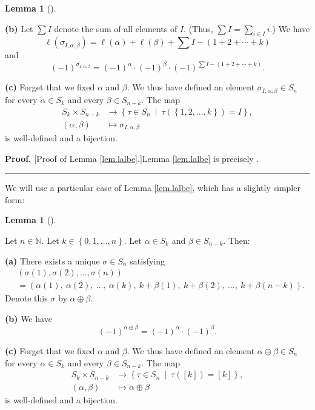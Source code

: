 \documentclass
[numbers=enddot,12pt,final,onecolumn,notitlepage,english]{scrartcl}%
\theoremstyle{definition}
\newtheorem{lem}[theo]{Lemma}
\newenvironment{lemma}[1][]
{\begin{lem}[#1]\begin{leftbar}}
{\end{leftbar}\end{lem}}
\newenvironment{proof}[1][Proof]{\noindent\textbf{#1.} }{\ \rule{0.5em}{0.5em}}
\let\sumnonlimits\sum
\renewcommand{\sum}{\sumnonlimits\limits}
\newenvironment{verlong}{}{}
\begin{document}
\begin{verlong}
\begin{lemma}
\textbf{(b)} Let $\sum I$ denote the sum of all elements of $I$. (Thus, $\sum
I=\sum_{i\in I}i$.) We have%
\[
\ell\left(  \sigma_{I,\alpha,\beta}\right)  =\ell\left(  \alpha\right)
+\ell\left(  \beta\right)  +\sum I-\left(  1+2+\cdots+k\right)
\]
and%
\[
\left(  -1\right)  ^{\sigma_{I,\alpha,\beta}}=\left(  -1\right)  ^{\alpha
}\cdot\left(  -1\right)  ^{\beta}\cdot\left(  -1\right)  ^{\sum I-\left(
1+2+\cdots+k\right)  }.
\]


\textbf{(c)} Forget that we fixed $\alpha$ and $\beta$. We thus have defined
an element $\sigma_{I,\alpha,\beta}\in S_{n}$ for every $\alpha\in S_{k}$ and
every $\beta\in S_{n-k}$. The map%
\begin{align*}
S_{k}\times S_{n-k}  &  \rightarrow\left\{  \tau\in S_{n}\ \mid\ \tau\left(
\left\{  1,2,\ldots,k\right\}  \right)  =I\right\}  ,\\
\left(  \alpha,\beta\right)   &  \mapsto\sigma_{I,\alpha,\beta}%
\end{align*}
is well-defined and a bijection.
\end{lemma}

\begin{proof}
[Proof of Lemma \ref{lem.lalbe}.]Lemma \ref{lem.lalbe} is precisely
\cite[Exercise 5.14]{detnotes}.
\end{proof}

We will use a particular case of Lemma \ref{lem.lalbe}, which has a slightly
simpler form:

\begin{lemma}
\label{lem.lalbe-k}Let $n\in\mathbb{N}$. Let $k\in\left\{  0,1,\ldots
,n\right\}  $. Let $\alpha\in S_{k}$ and $\beta\in S_{n-k}$. Then:

\textbf{(a)} There exists a unique $\sigma\in S_{n}$ satisfying%
\begin{align*}
&  \left(  \sigma\left(  1\right)  ,\sigma\left(  2\right)  ,\ldots
,\sigma\left(  n\right)  \right) \\
&  =\left(  \alpha\left(  1\right)  ,\ \alpha\left(  2\right)  ,\ \ldots
,\ \alpha\left(  k\right)  ,\ k+\beta\left(  1\right)  ,\ k+\beta\left(
2\right)  ,\ \ldots,\ k+\beta\left(  n-k\right)  \right)  .
\end{align*}
Denote this $\sigma$ by $\alpha\oplus\beta$.

\textbf{(b)} We have%
\[
\left(  -1\right)  ^{\alpha\oplus\beta}=\left(  -1\right)  ^{\alpha}%
\cdot\left(  -1\right)  ^{\beta}.
\]


\textbf{(c)} Forget that we fixed $\alpha$ and $\beta$. We thus have defined
an element $\alpha\oplus\beta\in S_{n}$ for every $\alpha\in S_{k}$ and every
$\beta\in S_{n-k}$. The map%
\begin{align*}
S_{k}\times S_{n-k}  &  \rightarrow\left\{  \tau\in S_{n}\ \mid\ \tau\left(
\left[  k\right]  \right)  =\left[  k\right]  \right\}  ,\\
\left(  \alpha,\beta\right)   &  \mapsto\alpha\oplus\beta
\end{align*}
is well-defined and a bijection.
\end{lemma}


\end{verlong}
\end{document}
